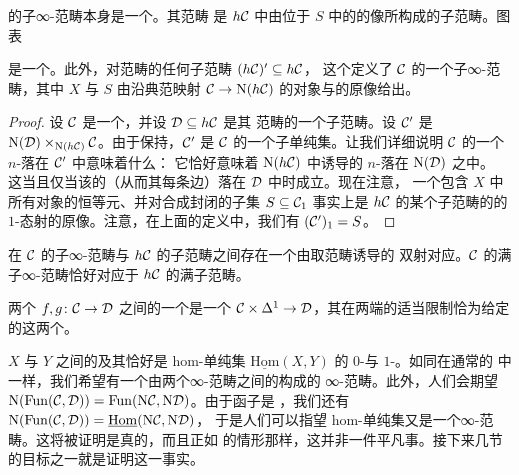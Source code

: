 \begin{lemma}\label{lem:sub-infinity-category}
\trInfinityCategory{}的子∞-范畴本身是一个\trInfinityCategory{}。其\trHomotopy{}范畴
是 $h\mathcal{C}$ 中由位于 $S$ 中的\trMorphism{}的像所构成的子范畴。图表
\begin{center}
\end{center}
是一个\trPullback{}。此外，对\trHomotopy{}范畴的任何子范畴 $(h\mathcal{C})' \subseteq h\mathcal{C}$，
这个\trPullback{}定义了 $\mathcal{C}$ 的一个子∞-范畴，其中 $X$ 与 $S$ 由沿典范映射
$\mathcal{C} \to \mathrm{N}(h\mathcal{C})$ 的对象与\trMorphism{}的原像给出。
\end{lemma}

\begin{proof}
设 $\mathcal{C}$ 是一个\trInfinityCategory{}，并设 $\mathcal{D} \subseteq h\mathcal{C}$ 是其%
\trHomotopy{}范畴的一个子范畴。设 $\mathcal{C}'$ 是\trPullback{}%
$\mathrm{N}(\mathcal{D}) \times_{\mathrm{N}(h\mathcal{C})} \mathcal{C}$。由于\trPullback{}保持\trMonomorphism{}，$\mathcal{C}'$ 是
$\mathcal{C}$ 的一个子单纯集。让我们详细说明 $\mathcal{C}$ 的一个 $n$-\trSimplex{}落在 $\mathcal{C}'$ 中意味着什么：
它恰好意味着 $\mathrm{N}(h\mathcal{C})$ 中诱导的 $n$-\trSimplex{}落在 $\mathrm{N}(\mathcal{D})$ 之中。
这当且仅当该\trSimplex{}的\trSpine{}（从而其每条边）落在 $\mathcal{D}$ 中时成立。现在注意，
一个包含 $X$ 中所有对象的恒等元、并对合成封闭的子集 $S \subseteq \mathcal{C}_1$ 事实上是
$h\mathcal{C}$ 的某个子范畴的\trNerve{}的 $1$-态射的原像。注意，在上面的定义中，我们有
$(\mathcal{C}')_1 = S$。
\end{proof}

\begin{corollary}\label{cor:subcat-correspondence}
在 $\mathcal{C}$ 的子∞-范畴与 $h\mathcal{C}$ 的子范畴之间存在一个由取\trHomotopy{}范畴诱导的
双射对应。$\mathcal{C}$ 的满子∞-范畴恰好对应于 $h\mathcal{C}$ 的满子范畴。
\end{corollary}

\begin{definition}\label{def:natural-transformation}
两个\trFunctor{} $f, g\colon \mathcal{C} \to \mathcal{D}$ 之间的一个\trNaturalTransformation{}是一个%
\trSimplicialMap{} $\mathcal{C} \times \Delta^1 \to \mathcal{D}$，其在两端的适当限制恰为给定的这两个\trFunctor{}。
\end{definition}

\begin{observation}\label{obs:hom-simplicial-infinity-category}
$X$ 与 $Y$ 之间的\trFunctor{}及其\trNaturalTransformation{}恰好是 hom-单纯集
$\underline{\mathrm{Hom}}(X, Y)$ 的 $0$-\trSimplex{}与 $1$-\trSimplex{}。如同在通常的%
\trCategoryTheory{}中一样，我们希望有一个由两个∞-范畴之间的\trFunctor{}构成的
∞-范畴。此外，人们会期望
$\mathrm{N}(\mathrm{Fun}(\mathcal{C}, \mathcal{D})) = \mathrm{Fun}(\mathrm{N}\mathcal{C}, \mathrm{N}\mathcal{D})$。由于\trNerve{}函子是%
\trFullyFaithful{}，我们还有
$\mathrm{N}(\mathrm{Fun}(\mathcal{C}, \mathcal{D})) = \underline{\mathrm{Hom}}(\mathrm{N}\mathcal{C}, \mathrm{N}\mathcal{D})$，
于是人们可以指望 hom-单纯集又是一个∞-范畴。这将被证明是真的，而且正如%
\trKanComplex{}的情形那样，这并非一件平凡事。接下来几节的目标之一就是证明这一事实。
\end{observation}
